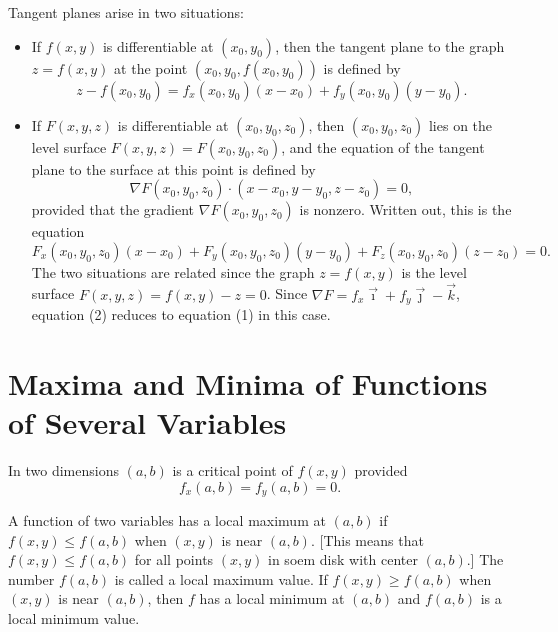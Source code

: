 \begin{facts}
	Tangent planes arise in two situations:
	\begin{itemize}
		\item If $f(x, y)$ is differentiable at $(x_0, y_0)$, then the tangent plane
			to the graph $z = f(x, y)$ at the point $(x_0, y_0, f(x_0, y_0))$ is
			defined by
			\begin{equation}
				z - f(x_0, y_0) = f_x(x_0, y_0) (x - x_0) + f_y(x_0, y_0) (y - y_0).
			\end{equation}
		\item If $F(x, y, z)$ is differentiable at $(x_0, y_0, z_0)$, then $(x_0,
			y_0, z_0)$ lies on the level surface $F(x, y, z) = F(x_0, y_0, z_0)$, and
			the equation of the tangent plane to the surface at this point is defined
			by
			\begin{equation}
				\nabla F(x_0, y_0, z_0) \cdot (x - x_0, y - y_0, z - z_0) = 0,
			\end{equation}
			provided that the gradient $\nabla F(x_0, y_0, z_0)$ is nonzero. Written
			out, this is the equation
			\[
				F_x(x_0, y_0, z_0) (x - x_0) + F_y(x_0, y_0, z_0) (y - y_0) + F_z(x_0,
				y_0, z_0) (z - z_0) = 0.
			\]
			The two situations are related since the graph $z = f(x, y)$ is the level
			surface $F(x, y, z) = f(x, y) - z = 0$. Since $\nabla F = f_x \vec{\imath}
			+ f_y \vec{\jmath} - \vec{k}$, equation (2) reduces to equation (1) in
			this case.
	\end{itemize}
\end{facts}

\section*{Maxima and Minima of Functions of Several Variables}

\begin{definition}
	In two dimensions $(a, b)$ is a critical point of $f(x, y)$ provided
	\[
		f_x(a, b) = f_y(a, b) = 0.
	\]
\end{definition}

\begin{definition}
	A function of two variables has a local maximum at $(a, b)$ if $f(x, y) \leq
	f(a, b)$ when $(x, y)$ is near $(a, b)$. [This means that $f(x, y) \leq f(a,
	b)$ for all points $(x, y)$ in soem disk with center $(a, b)$.] The number
	$f(a, b)$ is called a local maximum value. If $f(x, y) \geq f(a, b)$ when $(x,
	y)$ is near $(a, b)$, then $f$ has a local minimum at $(a, b)$ and $f(a, b)$
	is a local minimum value.
\end{definition}

